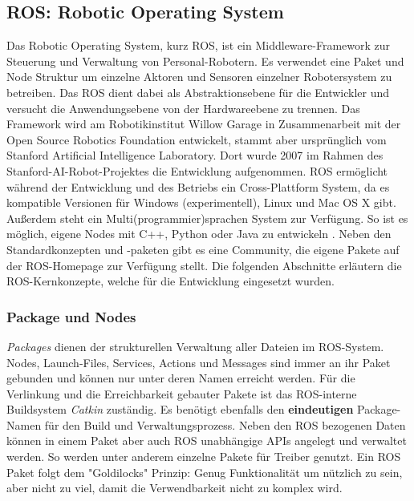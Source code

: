 \subsection{ROS: Robotic Operating System}
\label{sec:basic-ros}
    
Das Robotic Operating System, kurz ROS, ist ein Middleware-Framework zur Steuerung und Verwaltung von Personal-Robotern. Es verwendet eine Paket und Node Struktur um einzelne Aktoren und Sensoren einzelner Robotersystem zu betreiben. Das ROS dient dabei als Abstraktionsebene für die Entwickler und versucht die Anwendungsebene von der Hardwareebene zu trennen. Das Framework wird am Robotikinstitut Willow Garage in Zusammenarbeit mit der Open Source Robotics Foundation entwickelt, stammt aber ursprünglich vom Stanford Artificial Intelligence Laboratory. Dort wurde 2007 im Rahmen des Stanford-AI-Robot-Projektes die Entwicklung aufgenommen. ROS ermöglicht während der Entwicklung und des Betriebs ein Cross-Plattform System, da es kompatible Versionen für Windows (experimentell), Linux und Mac OS X gibt. Außerdem steht ein Multi(programmier)sprachen System zur Verfügung. So ist es möglich, eigene Nodes mit C++, Python oder Java zu entwickeln \citep{quigley2009ros}. Neben den Standardkonzepten und -paketen gibt es eine Community, die eigene Pakete auf der ROS-Homepage zur Verfügung stellt. Die folgenden Abschnitte erläutern die ROS-Kernkonzepte, welche für die Entwicklung eingesetzt wurden.

\subsubsection{Package und Nodes}

\textit{Packages} dienen der strukturellen Verwaltung aller Dateien im ROS-System. Nodes, Launch-Files, Services, Actions und Messages sind immer an ihr Paket gebunden und können nur unter deren Namen erreicht werden. Für die Verlinkung und die Erreichbarkeit gebauter Pakete ist das ROS-interne Buildsystem \textit{Catkin} zuständig. Es benötigt ebenfalls den \textbf{eindeutigen} Package-Namen für den Build und Verwaltungsprozess. Neben den ROS bezogenen Daten können in einem Paket aber auch ROS unabhängige APIs angelegt und verwaltet werden. So werden unter anderem einzelne Pakete für Treiber genutzt. Ein ROS Paket folgt dem "Goldilocks" Prinzip: Genug Funktionalität um nützlich zu sein, aber nicht zu viel, damit die Verwendbarkeit nicht zu komplex wird. 

